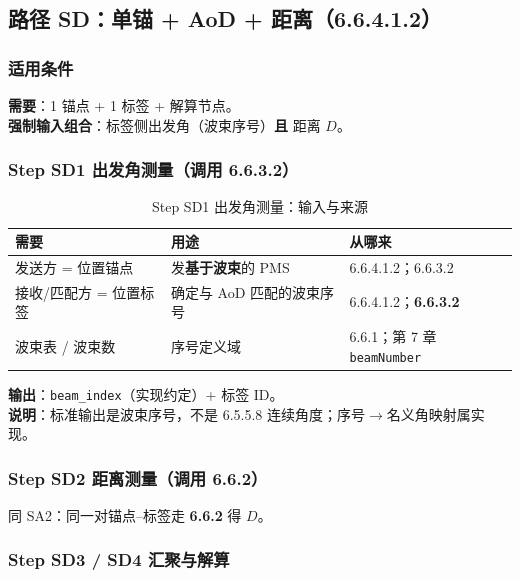 \documentclass[11pt,a4paper]{ctexart}
\begin{document}
\subsection{路径 SD：单锚 + AoD + 距离（6.6.4.1.2）}
\label{sec:sd}

\subsubsection{适用条件}

\textbf{需要}：1 锚点 + 1 标签 + 解算节点。\\
\textbf{强制输入组合}：标签侧出发角（波束序号）\textbf{且} 距离 $D$。

\subsubsection{Step SD1 出发角测量（调用 6.6.3.2）}

\begin{longtable}{L{3.4cm}L{4.8cm}L{4.8cm}}
\caption{Step SD1 出发角测量：输入与来源\label{tab:step127}} \\
\toprule
\textbf{需要} & \textbf{用途} & \textbf{从哪来} \\
\midrule
发送方 = 位置锚点 & 发\textbf{基于波束}的 PMS & 6.6.4.1.2；6.6.3.2 \\
接收/匹配方 = 位置标签 & 确定与 AoD 匹配的波束序号 & 6.6.4.1.2；\textbf{6.6.3.2} \\
波束表 / 波束数 & 序号定义域 & 6.6.1；第 7 章 \texttt{beamNumber} \\
\bottomrule
\end{longtable}

\textbf{输出}：\texttt{beam\_index}（实现约定）+ 标签 ID。\\
\textbf{说明}：标准输出是波束序号，不是 6.5.5.8 连续角度；序号$\rightarrow$名义角映射属实现。

\subsubsection{Step SD2 距离测量（调用 6.6.2）}

同 SA2：同一对锚点--标签走 \textbf{6.6.2} 得 $D$。

\subsubsection{Step SD3 / SD4 汇聚与解算}
\end{document}
